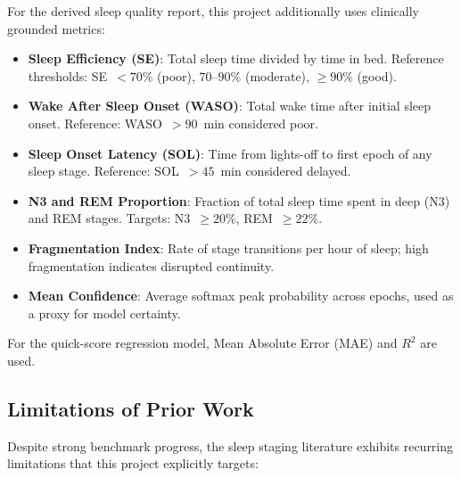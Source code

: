 \documentclass[10pt]{article}
\begin{document}
For the derived sleep quality report, this project additionally uses clinically grounded metrics:
\begin{itemize}
  \item \textbf{Sleep Efficiency (SE)}: Total sleep time divided by time in bed. Reference thresholds: SE~$<70\%$ (poor), $70$--$90\%$ (moderate), $\geq90\%$ (good).
  \item \textbf{Wake After Sleep Onset (WASO)}: Total wake time after initial sleep onset. Reference: WASO~$>90$~min considered poor.
  \item \textbf{Sleep Onset Latency (SOL)}: Time from lights-off to first epoch of any sleep stage. Reference: SOL~$>45$~min considered delayed.
  \item \textbf{N3 and REM Proportion}: Fraction of total sleep time spent in deep (N3) and REM stages. Targets: N3~$\geq20\%$, REM~$\geq22\%$.
  \item \textbf{Fragmentation Index}: Rate of stage transitions per hour of sleep; high fragmentation indicates disrupted continuity.
  \item \textbf{Mean Confidence}: Average softmax peak probability across epochs, used as a proxy for model certainty.
\end{itemize}

For the quick-score regression model, Mean Absolute Error (MAE) and $R^2$ are used.

\subsection{Limitations of Prior Work}
\label{sec:limitations}

Despite strong benchmark progress, the sleep staging literature exhibits recurring limitations that this project explicitly targets:
\end{document}
